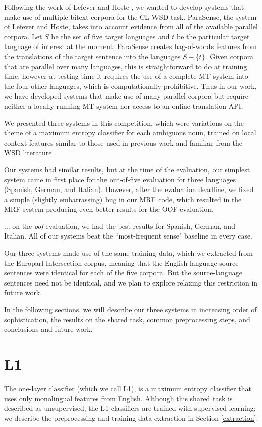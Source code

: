 \documentclass[11pt,letterpaper]{article}
\begin{document}
Following the work of Lefever and Hoste
, we wanted to develop systems
that make use of multiple bitext corpora for the CL-WSD task.  ParaSense, the
system of Lefever and Hoste, takes into account evidence from all of the
available parallel corpora. Let $S$ be the set of five target languages and $t$
be the particular target language of interest at the moment; ParaSense creates
bag-of-words features from the translations of the target sentence into the
languages $S - \lbrace{t \rbrace}$. Given corpora that are parallel over many
languages, this is straightforward to do at training time, however at testing
time it requires the use of a complete MT system into the four other languages,
which is computationally prohibitive. Thus in our work, we have developed
systems that make use of many parallel corpora but require neither a locally
running MT system nor access to an online translation API.

We presented three systems in this competition, which were variations on the
theme of a maximum entropy classifier for each ambiguous noun, trained on local
context features similar to those used in previous work and familiar from the
WSD literature.

Our systems had similar results, but at the time of the evaluation, our
simplest system came in first place for the out-of-five evaluation for three
languages (Spanish, German, and Italian).  However, after the evaluation
deadline, we fixed a simple (slightly embarrassing) bug in our MRF code, which
resulted in the MRF system producing even better results for the OOF
evaluation.

... on the \emph{oof} evaluation, we had the best results for Spanish, German,
and Italian.  All of our systems beat the ``most-frequent sense" baseline in
every case.

Our three systems made use of the same training data, which we extracted from
the Europarl Intersection corpus, meaning that the English-language source
sentences were identical for each of the five corpora. But the source-language
sentences need not be identical, and we plan to explore relaxing this
restriction in future work.

In the following sections, we will describe our three systems in increasing
order of sophistication, the results on the shared task, common preprocessing
steps, and conclusions and future work.

\section{L1}
The one-layer classifier (which we call L1), is a maximum entropy classifier
that uses only monolingual features from English.  Although this shared task is
described as unsupervised, the L1 classifiers are trained with supervised
learning; we describe the preprocessing and training data extraction in Section
\ref{extraction}.
\end{document}
